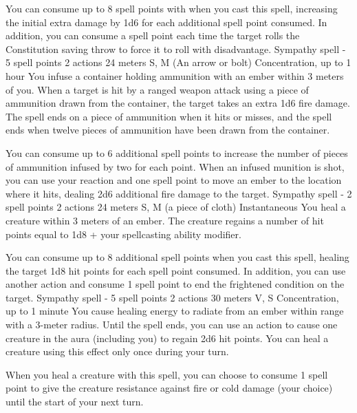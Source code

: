         You can consume up to 8 spell points with when you cast this spell, increasing the initial extra damage by 1d6 for each additional spell point consumed.
        In addition, you can consume a spell point each time the target rolls the Constitution saving throw to force it to roll with disadvantage.
        {Sympathy spell - 5 spell points}
        {2 actions}
        {24 meters}
        {S, M (An arrow or bolt)}
        {Concentration, up to 1 hour}
        You infuse a container holding ammunition with an ember within 3 meters of you.
        When a target is hit by a ranged weapon attack using a piece of ammunition drawn from the container, the target takes an extra 1d6 fire damage.
        The spell ends on a piece of ammunition when it hits or misses, and the spell ends when twelve pieces of ammunition have been drawn from the container.

        You can consume up to 6 additional spell points to increase the number of pieces of ammunition infused by two for each point.
        When an infused munition is shot, you can use your reaction and one spell point to move an ember to the location where it hits, dealing 2d6 additional fire damage to the target.
        {Sympathy spell - 2 spell points}
        {2 actions}
        {24 meters}
        {S, M (a piece of cloth)}
        {Instantaneous}
        You heal a creature within 3 meters of an ember.
        The creature regains a number of hit points equal to 1d8 + your spellcasting ability modifier.

        You can consume up to 8 additional spell points when you cast this spell, healing the target 1d8 hit points for each spell point consumed.
        In addition, you can use another action and consume 1 spell point to end the frightened condition on the target.
        {Sympathy spell - 5 spell points}
        {2 actions}
        {30 meters}
        {V, S}
        {Concentration, up to 1 minute}
        You cause healing energy to radiate from an ember within range with a 3-meter radius.
        Until the spell ends, you can use an action to cause one creature in the aura (including you) to regain 2d6 hit points.
        You can heal a creature using this effect only once during your turn.

        When you heal a creature with this spell, you can choose to consume 1 spell point to give the creature resistance against fire or cold damage (your choice) until the start of your next turn.

